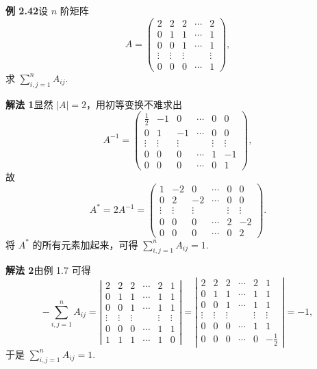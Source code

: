 \documentclass[UTF8, 12pt, fontset=fandol, oneside]{ctexart}
\begin{document}
\noindent\textbf{例 2.42}\quad 设 $n$ 阶矩阵
\[
A=
\left(
\begin{array}{ccccc}
2 & 2 & 2 & \cdots & 2\\
0 & 1 & 1 & \cdots & 1\\
0 & 0 & 1 & \cdots & 1\\
\vdots & \vdots & \vdots & & \vdots\\
0 & 0 & 0 & \cdots & 1
\end{array}
\right),
\]
求 $\sum\limits_{i,j=1}^n A_{ij}$.

\noindent\textbf{解法 1}\quad 显然 $|A|=2$，用初等变换不难求出
\[
A^{-1}=
\left(
\begin{array}{rrrrrr}
\frac12 & -1 & 0 & \cdots & 0 & 0\\
0 & 1 & -1 & \cdots & 0 & 0\\
\vdots & \vdots & \vdots & & \vdots & \vdots\\
0 & 0 & 0 & \cdots & 1 & -1\\
0 & 0 & 0 & \cdots & 0 & 1
\end{array}
\right),
\]
故
\[
A^*=2A^{-1}=
\left(
\begin{array}{rrrrrr}
1 & -2 & 0 & \cdots & 0 & 0\\
0 & 2 & -2 & \cdots & 0 & 0\\
\vdots & \vdots & \vdots & & \vdots & \vdots\\
0 & 0 & 0 & \cdots & 2 & -2\\
0 & 0 & 0 & \cdots & 0 & 2
\end{array}
\right).
\]
将 $A^*$ 的所有元素加起来，可得 $\sum\limits_{i,j=1}^n A_{ij}=1$.

\noindent\textbf{解法 2}\quad 由例 1.7 可得
\[
-\sum_{i,j=1}^n A_{ij}=
\left|
\begin{array}{cccccc}
2 & 2 & 2 & \cdots & 2 & 1\\
0 & 1 & 1 & \cdots & 1 & 1\\
0 & 0 & 1 & \cdots & 1 & 1\\
\vdots & \vdots & \vdots & & \vdots & \vdots\\
0 & 0 & 0 & \cdots & 1 & 1\\
1 & 1 & 1 & \cdots & 1 & 0
\end{array}
\right|
=
\left|
\begin{array}{cccccc}
2 & 2 & 2 & \cdots & 2 & 1\\
0 & 1 & 1 & \cdots & 1 & 1\\
0 & 0 & 1 & \cdots & 1 & 1\\
\vdots & \vdots & \vdots & & \vdots & \vdots\\
0 & 0 & 0 & \cdots & 1 & 1\\
0 & 0 & 0 & \cdots & 0 & -\frac12
\end{array}
\right|
=-1,
\]
于是 $\sum\limits_{i,j=1}^n A_{ij}=1$.
\end{document}
